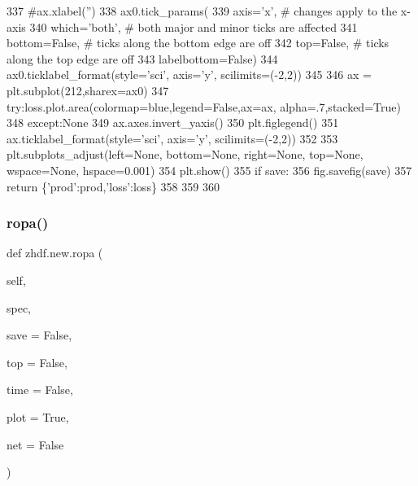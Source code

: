 \begin{DoxyCode}
337             \textcolor{comment}{#ax.xlabel('')}
338             ax0.tick\_params(
339                 axis=\textcolor{stringliteral}{'x'},          \textcolor{comment}{# changes apply to the x-axis}
340                 which=\textcolor{stringliteral}{'both'},      \textcolor{comment}{# both major and minor ticks are affected}
341                 bottom=\textcolor{keyword}{False},      \textcolor{comment}{# ticks along the bottom edge are off}
342                 top=\textcolor{keyword}{False},         \textcolor{comment}{# ticks along the top edge are off}
343                 labelbottom=\textcolor{keyword}{False})
344             ax0.ticklabel\_format(style=\textcolor{stringliteral}{'sci'}, axis=\textcolor{stringliteral}{'y'}, scilimits=(-2,2))
345 
346             ax = plt.subplot(212,sharex=ax0)
347             \textcolor{keywordflow}{try}:loss.plot.area(colormap=blue,legend=\textcolor{keyword}{False},ax=ax, alpha=.7,stacked=\textcolor{keyword}{True})
348             \textcolor{keywordflow}{except}:\textcolor{keywordtype}{None}
349             ax.axes.invert\_yaxis()
350             plt.figlegend()
351             ax.ticklabel\_format(style=\textcolor{stringliteral}{'sci'}, axis=\textcolor{stringliteral}{'y'}, scilimits=(-2,2))
352 
353             plt.subplots\_adjust(left=\textcolor{keywordtype}{None}, bottom=\textcolor{keywordtype}{None}, right=\textcolor{keywordtype}{None}, top=\textcolor{keywordtype}{None}, wspace=\textcolor{keywordtype}{None}, hspace=0.001)
354             plt.show()
355             \textcolor{keywordflow}{if} save:
356                 fig.savefig(save)
357         \textcolor{keywordflow}{return} \{\textcolor{stringliteral}{'prod'}:prod,\textcolor{stringliteral}{'loss'}:loss\}
358 
359 
360 
\end{DoxyCode}
\mbox{\label{classzhdf_1_1new_aad68ddbb6791ca56a8495047091ccd72}} 
\subsubsection{\texorpdfstring{ropa()}{ropa()}\hspace{0.1cm}{\footnotesize\ttfamily [2/2]}}
{\footnotesize\ttfamily def zhdf.\+new.\+ropa (\begin{DoxyParamCaption}\item[{}]{self,  }\item[{}]{spec,  }\item[{}]{save = {\ttfamily False},  }\item[{}]{top = {\ttfamily False},  }\item[{}]{time = {\ttfamily False},  }\item[{}]{plot = {\ttfamily True},  }\item[{}]{net = {\ttfamily False} }\end{DoxyParamCaption})}


